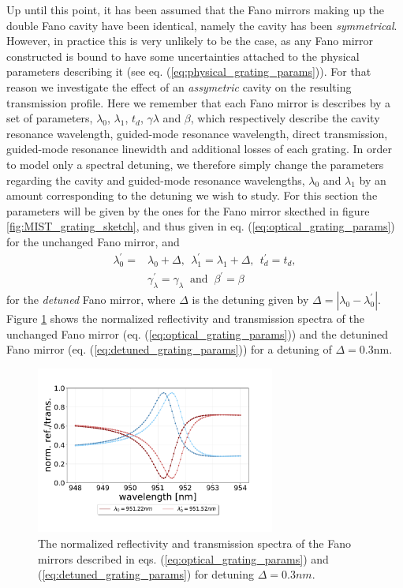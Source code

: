 Up until this point, it has been assumed that the Fano mirrors making up the double Fano cavity have been identical, namely the cavity has been \emph{symmetrical}. However, in practice this is very unlikely to be the case, as any Fano mirror constructed is bound to have some uncertainties attached to the physical parameters describing it (see eq. (\ref{eq:physical_grating_params})). For that reason we investigate the effect of an \emph{assymetric} cavity on the resulting transmission profile. Here we remember that each Fano mirror is describes by a set of parameters, $\lambda_0$, $\lambda_1$, $t_d$, $\gamma \lambda$ and $\beta$, which respectively describe the cavity resonance wavelength, guided-mode resonance wavelength, direct transmission, guided-mode resonance linewidth and additional losses of each grating. In order to model only a spectral detuning, we therefore simply change the parameters regarding the cavity and guided-mode resonance wavelengths, $\lambda_0$ and $\lambda_1$ by an amount corresponding to the detuning we wish to study. For this section the parameters will be given by the ones for the Fano mirror skecthed in figure \ref{fig:MIST_grating_sketch}, and thus given in eq. (\ref{eq:optical_grating_params}) for the unchanged Fano mirror, and
\begin{equation}
    \begin{split}
    \lambda_0^{\prime} = &\lambda_0 + \Delta,\:\: \lambda_1^{\prime} = \lambda_1 + \Delta,\:\: t_d^{\prime} = t_d,\\ &\gamma_{\lambda}^{\prime} = \gamma_{\lambda}\: \text{ and }\: \beta^{\prime} = \beta
    \end{split}
    \label{eq:detuned_grating_params}
\end{equation}
for the \emph{detuned} Fano mirror, where $\Delta$ is the detuning given by $\Delta = |\lambda_0 - \lambda_0^{\prime}|$. Figure \ref{fig:detuned_grating_spectra} shows the normalized reflectivity and transmission spectra of the unchanged Fano mirror (eq. (\ref{eq:optical_grating_params})) and the detunined Fano mirror (eq. (\ref{eq:detuned_grating_params})) for a detuning of $\Delta = 0.3$nm.

\begin{figure}[h!]
    \centering
    \includegraphics[width=0.7\textwidth]{figures/detuned_grating_spectra.pdf}
    \caption{The normalized reflectivity and transmission spectra of the Fano mirrors described in eqs. (\ref{eq:optical_grating_params}) and (\ref{eq:detuned_grating_params}) for detuning $\Delta = 0.3nm$.}
    \label{fig:detuned_grating_spectra}
\end{figure}

